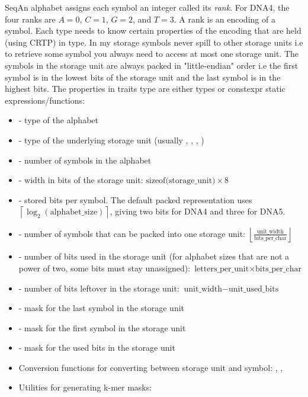 SeqAn alphabet assigns each symbol an integer called its \emph{rank}. For DNA4,
the four ranks are \(A=0\), \(C=1\), \(G=2\), and \(T=3\). A rank is an
encoding of a symbol. Each  type needs to know certain properties of the encoding that are held (using CRTP) in  type. 
In my storage symbols never spill to other storage units i.e to retrieve some symbol you always need to access at most one storage unit.
The symbols in the storage unit are always packed in "little-endian" order i.e the first symbol is in the lowest bits of the storage unit and the last symbol is in the highest bits.
The properties in traits type are either types or constexpr static expressions/functions:
\begin{itemize}
  \item {} - type of the alphabet
  \item {} - type of the underlying storage unit (usually , , , )
  \item {} - number of symbols in the alphabet
  \item {} - width in bits of the storage unit: \(\text{sizeof(storage\_unit)} \times 8\)
  \item {} - stored bits per symbol. The default packed
  representation uses \(\left\lceil\log_2(\text{alphabet\_size})\right\rceil\),
  giving two bits for DNA4 and three for DNA5.
  \item {} - number of symbols that can be packed into one storage unit: \(\left\lfloor\frac{\text{unit\_width}}{\text{bits\_per\_char}}\right\rfloor\)
  \item {} - number of bits used in the storage unit (for alphabet sizes that are not a power of two, some bits must stay unassigned): \(\text{letters\_per\_unit} \times \text{bits\_per\_char}\)
  \item {} - number of bits leftover in the storage unit: \(\text{unit\_width} - \text{unit\_used\_bits}\)
  \item {} - mask for the last symbol in the storage unit
  \item {} - mask for the first symbol in the storage unit
  \item {} - mask for the used bits in the storage unit
  \item Conversion functions for converting between storage unit and symbol: , , 
  \item Utilities for generating k-mer masks: 
\end{itemize}

